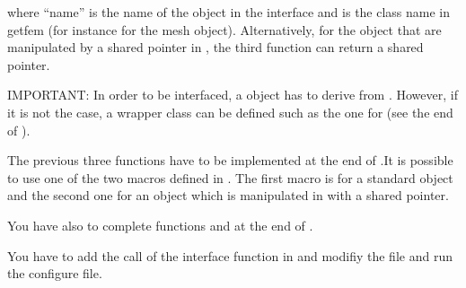 \documentclass[a4paper,11pt,english]{sphinxmanual}
\begin{document}
\begin{sphinxVerbatim}[commandchars=\\\{\}]
   
   
   
\end{sphinxVerbatim}

where “name” is the name of the object in the interface and  is the class name in getfem (for instance   for the mesh object). Alternatively, for the object that are manipulated by a shared pointer in , the third function can return a shared pointer.

IMPORTANT: In order to be interfaced, a  object has to derive from . However, if it is not the case, a wrapper class can be defined such as the one for  (see the end of ).

The previous three functions have to be implemented at the end of .It is possible to use one of the two macros defined in . The first macro is for a standard object and the second one for an object which is manipulated in  with a shared pointer.

You have also to complete functions  and  at the end of .

You have to add the call of the interface function in  and modifiy the file  and run the configure file.
\end{document}
